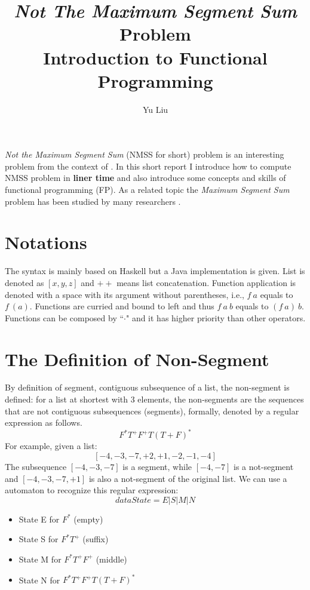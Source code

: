 \documentclass[10pt,a4paper]{article}
\author{Yu Liu}
\title{\textsl{Not The Maximum Segment Sum} Problem \\ Introduction to Functional Programming}
\newcommand{\concat}{\mathbin{+\!\!+}}
\begin{document}
\maketitle

\textsl{Not the Maximum Segment Sum} (NMSS for short) problem is an interesting problem from the context of \cite{Bird}.
In this short report I introduce how to compute NMSS problem in \textbf{liner time} and also introduce some concepts and skills of functional programming (FP). As a related topic the \textsl{Maximum Segment Sum} problem has been studied by many researchers \cite{Cole93,HuIT96d,MMMH07}.

\section{Notations}
The syntax is mainly based on Haskell but a Java implementation is given.
List is denoted as  \([x,y,z]\) and $\concat$ means list concatenation. 
Function application is denoted with a space with its argument without parentheses, i.e., \(f~a\) equals to \(f~(a)\). 
Functions are curried and bound to left and thus \(f~a~b\) equals to \((f~a)~b\).
Functions can be composed by ``$\cdot$" and it has higher priority than other operators.
\section{The Definition of Non-Segment}
By definition of segment, contiguous subsequence of a list,
the non-segment is defined: for a list at shortest with 3 elements, the non-segments are 
the sequences that are not contiguous subsequences (segments), formally, denoted by a regular expression
 as follows.
\[
F^*T^+F^+T(T+F)^*
\]
For example, given a list:
\[
[-4,-3,-7,+2,+1,-2,-1,-4]
\] 
The subsequence \([-4,-3,-7]\) is a segment, while \([-4,-7]\) is a not-segment and \([-4,-3,-7, +1]\) is also a not-segment of the original list.
We can use a automaton to recognize this regular expression:
\[
data State = E|S|M|N
\]
\begin{itemize}
	\item State E for \( F^*\) (empty)
	\item State S for \( F^*T^+\) (suffix)
	\item State M for \( F^*T^+F^+\) (middle)
	\item State N for \( F^*T^+F^+T(T+F)^*\)
\end{itemize}
\end{document}

